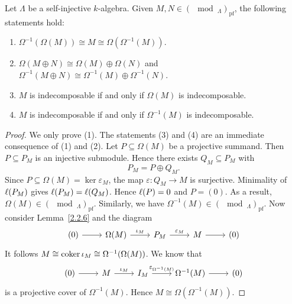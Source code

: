 
\begin{lemma}\label{2.2.7}
  Let $\Lambda$ be a self-injective $k$-algebra. Given $M,N \in (\mod_\Lambda)_{\mathrm{pf}}$, the
  following statements hold:
  \begin{enumerate}
  \item $\Omega^{-1}(\Omega(M)) \cong  M \cong  \Omega(\Omega^{-1}(M))$.
  \item $\Omega(M \oplus N) \cong  \Omega(M) \oplus \Omega(N)$ and $\Omega^{-1}(M \oplus N) \cong  \Omega^{-1}(M) \oplus \Omega^{-1}(N)$.
  \item $M$ is indecomposable if and only if $\Omega(M)$ is indecomposable.
  \item $M$ is indecomposable if and only if $\Omega^{-1}(M)$ is indecomposable.
  \end{enumerate}
\end{lemma}


\begin{proof}
We only prove (1). The statements (3) and (4) are an immediate consequence of (1) and (2). Let $P \subseteq \Omega(M)$ be a projective summand. Then $P \subseteq P_M$ is an injective submodule. Hence there exists $Q_M \subseteq P_M$ with
\[
P_M = P \oplus Q_M.
\]
Since $P \subseteq \Omega(M) = \ker \varepsilon_M$, the map $\varepsilon: Q_M \to M$ is surjective. Minimality of $\ell(P_M)$  gives $\ell(P_M) = \ell(Q_M)$. Hence $\ell(P) = 0$ and $P = (0)$.
  As a result, $\Omega(M) \in (\mod_\Lambda)_{\mathrm{pf}}$. Similarly, we have $\Omega^{-1}(M) \in 
  (\mod_\Lambda)_{\mathrm{pf}}$. Now consider Lemma~\ref{2.2.6} and the diagram
   \[
    \begin{tikzcd}
      (0) \ar[r] & \Omega(M) \ar[r,"\iota_M"] & P_M \rar["\varepsilon_M"] & M \ar[r] & (0)
    \end{tikzcd}
   \]
   It follows $M \cong  \operatorname{coker} \iota _M \cong  \Omega^{-1}(\Omega(M))$.
   We know that
   \[
    \begin{tikzcd}
      (0) \ar[r]& M \rar["\iota _M"]& I_M \rar["\varepsilon_{\Omega^{-1}(M)}"]& \Omega^{-1}(M) \ar[r]& (0)
    \end{tikzcd}
   \]
  is a projective cover of $\Omega^{-1}(M)$. Hence $M \cong  \Omega(\Omega^{-1}(M))$.
\end{proof}

